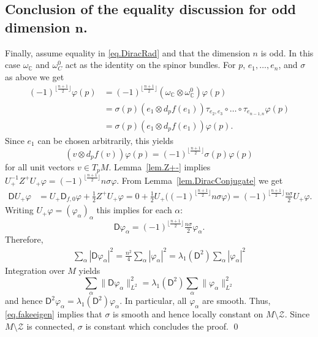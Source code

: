 \documentclass[11pt,reqno]{amsart}
\newcommand{\ZZ}{\mathscr{Z}}
\newcommand{\C}{\mathbb{C}}
\newcommand{\D}{\mathsf{D}}
\renewcommand{\phi}{\varphi}
\newcommand{\<}{\langle}
\renewcommand{\>}{\rangle}
\theoremstyle{definition}
\begin{document}
\subsection{\texorpdfstring{Conclusion of the equality discussion for odd dimension $\boldsymbol{n}$.}{Conclusion of the equality discussion for odd dimension n}}
Finally, assume equality in \eqref{eq.DiracRad} and that the dimension $n$ is odd.
In this case $\omega_\C$ and $\omega_C^0$ act as the identity on the spinor bundles. 
For $p$, $e_1,\dots,e_n$, and $\sigma$ as above we get 
\begin{align*}
(-1)^{\lfloor \frac{n+1}{2}\rfloor}\phi(p)
&=
(-1)^{\lfloor \frac{n+1}{2}\rfloor}(\omega_\C \otimes \omega_\C^0) \phi(p) \\
&=
\sigma(p)(e_1\otimes d_pf(e_1))\tau_{e_2,e_3}\circ \dots \circ \tau_{e_{n-1,n}}\phi(p)\\
&=
\sigma(p)(e_1\otimes d_pf(e_1))\phi(p) .
\end{align*}
Since $e_1$ can be chosen arbitrarily, this yields 
$$
(v\otimes d_pf(v))\phi(p)
=
(-1)^{\lfloor \frac{n+1}{2}\rfloor}\sigma(p)\phi(p)
$$
for all unit vectors $v\in T_pM$.
Lemma~\ref{lem.Z+-} implies $U_+^{-1}Z^+U_+\phi = (-1)^{\lfloor \frac{n+1}{2}\rfloor}n\sigma\phi$.
From Lemma~\ref{lem.DiracConjugate} we get
\begin{align*}
\D U_+\phi
&=
U_+\D_{f,0}\phi + \tfrac12 Z^+U_+\phi 
=
0 + \tfrac12 U_+\big((-1)^{\lfloor \frac{n+1}{2}\rfloor}n\sigma\phi\big) 
=
(-1)^{\lfloor \frac{n+1}{2}\rfloor}\tfrac{n\sigma}{2} U_+\phi .
\end{align*}
Writing $U_+\phi=(\phi_\alpha)_\alpha$ this implies for each $\alpha$:
\begin{equation}
\D \phi_\alpha = (-1)^{\lfloor \frac{n+1}{2}\rfloor}\tfrac{n\sigma}{2}\phi_\alpha .
\label{eq.fakeeigen}
\end{equation}
Therefore,
\begin{align*}
\sum_\alpha |\D\phi_\alpha|^2
=
\tfrac{n^2}{4}\sum_\alpha |\phi_\alpha|^2
=
\lambda_1(\D^2)\sum_\alpha |\phi_\alpha|^2
\end{align*}
Integration over $M$ yields
$$
\sum_\alpha \|\D\phi_\alpha\|_{L^2}^2
=
\lambda_1(\D^2)\sum_\alpha \|\phi_\alpha\|_{L^2}^2
$$
and hence $\D^2\phi_\alpha = \lambda_1(\D^2)\phi_\alpha$.
In particular, all $\phi_\alpha$ are smooth. 
Thus, \eqref{eq.fakeeigen} implies that $\sigma$ is smooth and hence locally constant on $M\setminus\ZZ$.
Since $M\setminus\ZZ$ is connected, $\sigma$ is constant which concludes the proof.
\hfill\qed
\end{document}
